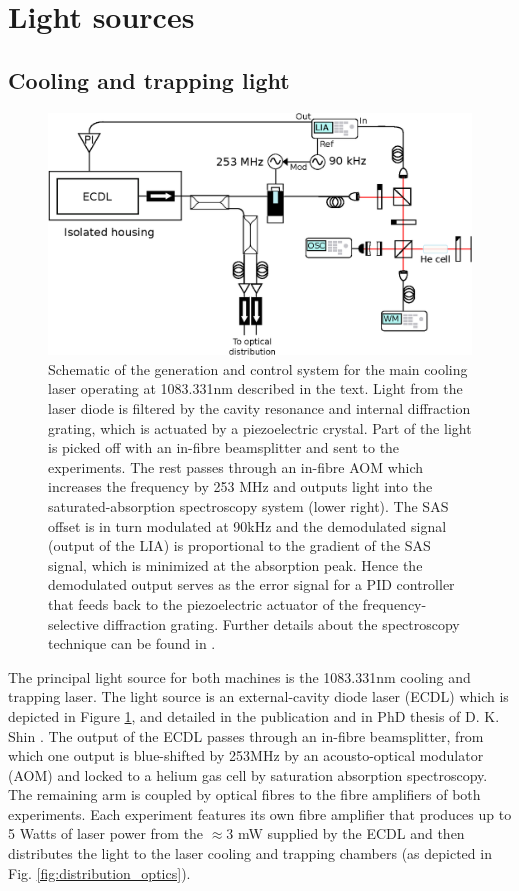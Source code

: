 \section{Light sources}\label{ssec:lasers}
\subsection{Cooling and trapping light}
	
	\begin{figure}
		\centering
		\includegraphics[width=\textwidth]{fig/apparatus/master_laser_system}
		\caption{Schematic of the generation and control system for the main cooling laser operating at 1083.331nm described in the text. Light from the laser diode is filtered by the cavity resonance and internal diffraction grating, which is actuated by a piezoelectric crystal. Part of the light is picked off with an in-fibre beamsplitter and sent to the experiments. The rest passes through an in-fibre AOM which increases the frequency by 253 MHz and outputs light into the saturated-absorption spectroscopy system (lower right). The SAS offset is in turn modulated at 90kHz and the demodulated signal (output of the LIA) is proportional to the gradient of the SAS signal, which is minimized at the absorption peak. Hence the demodulated output serves as the error signal for a PID controller that feeds back to the piezoelectric actuator of the frequency-selective diffraction grating. Further details about the spectroscopy technique can be found in \cite{ShinThesis,FootAtomic}.}
		\label{fig:main_laser}
	\end{figure}
	
	The principal light source for both machines is the 1083.331nm cooling and trapping laser.
	The light source is an external-cavity diode laser (ECDL) which is depicted in Figure \ref{fig:main_laser}, and detailed in the publication \cite{Shin16} and in PhD thesis of D. K. Shin \cite{ShinThesis}.
	The output of the ECDL passes through an in-fibre beamsplitter, from which one output is blue-shifted by 253MHz by an acousto-optical modulator (AOM) and locked to a helium gas cell by saturation absorption spectroscopy.
	The remaining arm is coupled by optical fibres to the fibre amplifiers of both experiments.
	Each experiment features its own fibre amplifier that produces up to 5 Watts of laser power from the $\approx$3 mW supplied by the ECDL and then distributes the light to the laser cooling and trapping chambers (as depicted in Fig. \ref{fig:distribution_optics}).

